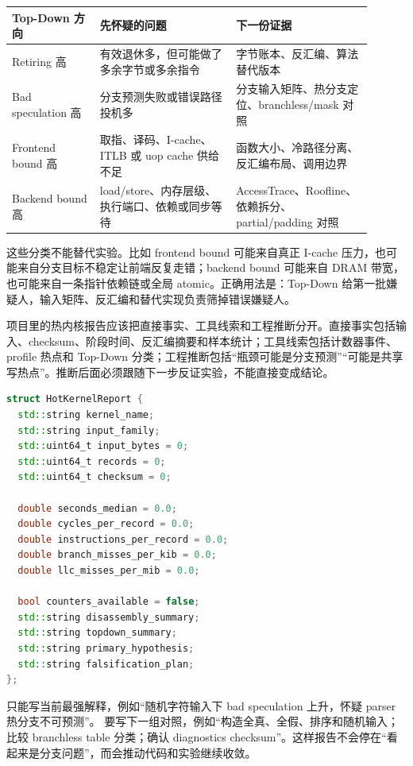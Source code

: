 \begin{center}
\small
\begin{tabular}{@{}p{0.22\linewidth}p{0.34\linewidth}p{0.34\linewidth}@{}}
\toprule
Top-Down 方向 & 先怀疑的问题 & 下一份证据 \\
\midrule
Retiring 高 & 有效退休多，但可能做了多余字节或多余指令 & 字节账本、反汇编、算法替代版本 \\
Bad speculation 高 & 分支预测失败或错误路径投机多 & 分支输入矩阵、热分支定位、branchless/mask 对照 \\
Frontend bound 高 & 取指、译码、I-cache、ITLB 或 uop cache 供给不足 & 函数大小、冷路径分离、反汇编布局、调用边界 \\
Backend bound 高 & load/store、内存层级、执行端口、依赖或同步等待 & AccessTrace、Roofline、依赖拆分、partial/padding 对照 \\
\bottomrule
\end{tabular}
\end{center}

这些分类不能替代实验。比如 frontend bound 可能来自真正 I-cache 压力，也可能来自分支目标不稳定让前端反复走错；backend bound 可能来自 DRAM 带宽，也可能来自一条指针依赖链或全局 atomic。正确用法是：Top-Down 给第一批嫌疑人，输入矩阵、反汇编和替代实现负责筛掉错误嫌疑人。

项目里的热内核报告应该把直接事实、工具线索和工程推断分开。直接事实包括输入、checksum、阶段时间、反汇编摘要和样本统计；工具线索包括计数器事件、profile 热点和 Top-Down 分类；工程推断包括“瓶颈可能是分支预测”“可能是共享写热点”。推断后面必须跟随下一步反证实验，不能直接变成结论。

\begin{lstlisting}[language=C++,caption={HotKernelReport 的扩展字段}]
struct HotKernelReport {
  std::string kernel_name;
  std::string input_family;
  std::uint64_t input_bytes = 0;
  std::uint64_t records = 0;
  std::uint64_t checksum = 0;

  double seconds_median = 0.0;
  double cycles_per_record = 0.0;
  double instructions_per_record = 0.0;
  double branch_misses_per_kib = 0.0;
  double llc_misses_per_mib = 0.0;

  bool counters_available = false;
  std::string disassembly_summary;
  std::string topdown_summary;
  std::string primary_hypothesis;
  std::string falsification_plan;
};
\end{lstlisting}

 只能写当前最强解释，例如“随机字符输入下 bad speculation 上升，怀疑 parser 热分支不可预测”。 要写下一组对照，例如“构造全真、全假、排序和随机输入；比较 branchless table 分类；确认 diagnostics checksum”。这样报告不会停在“看起来是分支问题”，而会推动代码和实验继续收敛。


